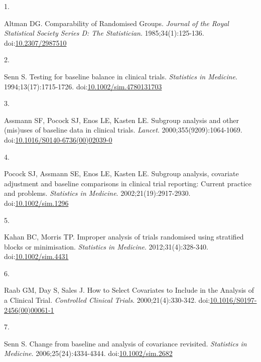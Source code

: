 \documentclass[
  11pt,
]{article}
\newlength{\cslhangindent}
\newlength{\csllabelwidth}
\newenvironment{CSLReferences}[2] %
 {\begin{list}{}{%
  \setlength{\itemindent}{0pt}
  \setlength{\leftmargin}{0pt}
  \setlength{\parsep}{0pt}
  \ifodd #1
   \setlength{\leftmargin}{\cslhangindent}
   \setlength{\itemindent}{-1\cslhangindent}
  \fi
  \setlength{\itemsep}{#2\baselineskip}}}
 {\end{list}}
\newcommand{\CSLLeftMargin}[1]{\parbox[t]{\csllabelwidth}{\strut#1\strut}}
\newcommand{\CSLRightInline}[1]{\parbox[t]{\linewidth - \csllabelwidth}{\strut#1\strut}}
\begin{document}
\protect{}\label{refs}
\begin{CSLReferences}{0}{1}
\CSLLeftMargin{1. }%
\CSLRightInline{Altman DG. Comparability of {Randomised Groups}. \emph{Journal of the Royal Statistical Society Series D: The Statistician}. 1985;34(1):125-136. doi:\href{https://doi.org/10.2307/2987510}{10.2307/2987510}}

\CSLLeftMargin{2. }%
\CSLRightInline{Senn S. Testing for baseline balance in clinical trials. \emph{Statistics in Medicine}. 1994;13(17):1715-1726. doi:\href{https://doi.org/10.1002/sim.4780131703}{10.1002/sim.4780131703}}

\CSLLeftMargin{3. }%
\CSLRightInline{Assmann SF, Pocock SJ, Enos LE, Kasten LE. Subgroup analysis and other (mis)uses of baseline data in clinical trials. \emph{Lancet}. 2000;355(9209):1064-1069. doi:\href{https://doi.org/10.1016/S0140-6736(00)02039-0}{10.1016/S0140-6736(00)02039-0}}

\CSLLeftMargin{4. }%
\CSLRightInline{Pocock SJ, Assmann SE, Enos LE, Kasten LE. Subgroup analysis, covariate adjustment and baseline comparisons in clinical trial reporting: Current practice and problems. \emph{Statistics in Medicine}. 2002;21(19):2917-2930. doi:\href{https://doi.org/10.1002/sim.1296}{10.1002/sim.1296}}

\CSLLeftMargin{5. }%
\CSLRightInline{Kahan BC, Morris TP. Improper analysis of trials randomised using stratified blocks or minimisation. \emph{Statistics in Medicine}. 2012;31(4):328-340. doi:\href{https://doi.org/10.1002/sim.4431}{10.1002/sim.4431}}

\CSLLeftMargin{6. }%
\CSLRightInline{Raab GM, Day S, Sales J. How to {Select Covariates} to {Include} in the {Analysis} of a {Clinical Trial}. \emph{Controlled Clinical Trials}. 2000;21(4):330-342. doi:\href{https://doi.org/10.1016/S0197-2456(00)00061-1}{10.1016/S0197-2456(00)00061-1}}

\CSLLeftMargin{7. }%
\CSLRightInline{Senn S. Change from baseline and analysis of covariance revisited. \emph{Statistics in Medicine}. 2006;25(24):4334-4344. doi:\href{https://doi.org/10.1002/sim.2682}{10.1002/sim.2682}}


\end{CSLReferences}
\end{document}
